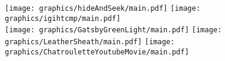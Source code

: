 \documentclass{article}
\begin{document}
    \thispagestyle{empty}%
    \begin{figure}[h]
        \centering
            {\texttt{[image: graphics/hideAndSeek/main.pdf]}}
            \hspace{0.5in}
            {\texttt{[image: graphics/igihtcmp/main.pdf]}}  \\ \vspace{0.5in}
            \hspace{0.5in}
            {\texttt{[image: graphics/GatsbyGreenLight/main.pdf]}}
            \hspace{0.5in}
            {\texttt{[image: graphics/LeatherSheath/main.pdf]}}
            \hspace{0.5in}
            {\texttt{[image: graphics/ChatrouletteYoutubeMovie/main.pdf]}}
            \hspace{0.5in}
    \end{figure}
\end{document}
